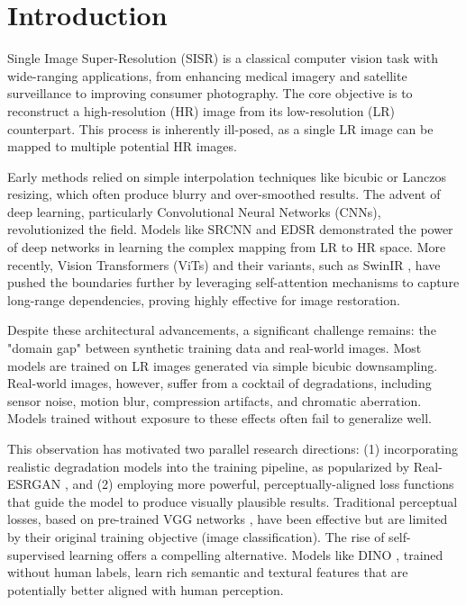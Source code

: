 \documentclass[10pt,twocolumn,letterpaper]{article}
\begin{document}
\section{Introduction}
\label{sec:intro}

Single Image Super-Resolution (SISR) is a classical computer vision task with wide-ranging applications, from enhancing medical imagery and satellite surveillance to improving consumer photography. The core objective is to reconstruct a high-resolution (HR) image from its low-resolution (LR) counterpart. This process is inherently ill-posed, as a single LR image can be mapped to multiple potential HR images.

Early methods relied on simple interpolation techniques like bicubic or Lanczos resizing, which often produce blurry and over-smoothed results. The advent of deep learning, particularly Convolutional Neural Networks (CNNs), revolutionized the field. Models like SRCNN \cite{dong2015image} and EDSR \cite{lim2017enhanced} demonstrated the power of deep networks in learning the complex mapping from LR to HR space. More recently, Vision Transformers (ViTs) \cite{dosovitskiy2020image} and their variants, such as SwinIR \cite{liang2021swinir}, have pushed the boundaries further by leveraging self-attention mechanisms to capture long-range dependencies, proving highly effective for image restoration.

Despite these architectural advancements, a significant challenge remains: the "domain gap" between synthetic training data and real-world images. Most models are trained on LR images generated via simple bicubic downsampling. Real-world images, however, suffer from a cocktail of degradations, including sensor noise, motion blur, compression artifacts, and chromatic aberration. Models trained without exposure to these effects often fail to generalize well.

This observation has motivated two parallel research directions: (1) incorporating realistic degradation models into the training pipeline, as popularized by Real-ESRGAN \cite{wang2021real}, and (2) employing more powerful, perceptually-aligned loss functions that guide the model to produce visually plausible results. Traditional perceptual losses, based on pre-trained VGG networks \cite{simonyan2014very}, have been effective but are limited by their original training objective (image classification). The rise of self-supervised learning offers a compelling alternative. Models like DINO \cite{caron2021emerging}, trained without human labels, learn rich semantic and textural features that are potentially better aligned with human perception.
\end{document}
